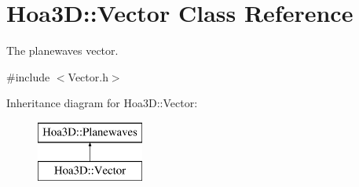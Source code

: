 \hypertarget{class_hoa3_d_1_1_vector}{\section{Hoa3\-D\-:\-:Vector Class Reference}
\label{class_hoa3_d_1_1_vector}
}


The planewaves vector.  




{\ttfamily \#include $<$Vector.\-h$>$}

Inheritance diagram for Hoa3\-D\-:\-:Vector\-:\begin{figure}[H]
\begin{center}
\leavevmode
\includegraphics[height=2.000000cm]{class_hoa3_d_1_1_vector}
\end{center}
\end{figure}
